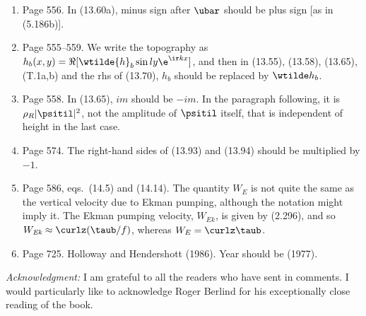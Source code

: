 \documentclass[10pt]{article}
\begin{document}
\begin{enumerate}
\item Page 556. In  (13.60a), minus sign after $\ubar$ should be plus sign [as in (5.186b)].

\item Page 555--559. We write the topography as $h_b(x,y)= \Re [ \wtilde{h}_b \sin ly \e^{\ir kx} ]$, and then in (13.55), (13.58), (13.65), (T.1a,b) and the rhs of (13.70), $h_b$ should be replaced by $\wtilde h_b$.

\item Page 558. In (13.65), $im$ should be $-im$. In the paragraph following,
   it is $\rho_R |\psitil|^2$, not the amplitude of $\psitil$ itself, that is independent of height in the last case.

\item Page 574. The right-hand sides of (13.93) and (13.94) should be multiplied by $-1$.

\item Page 586, eqs.\ (14.5) and (14.14). The quantity $W_E$ is not quite the same as the vertical velocity due to Ekman pumping, although the notation might imply it. The Ekman pumping velocity, $W_{\textit{Ek}}$, is given by (2.296), and so $W_{\textit{Ek}} \approx \curlz (\taub/f)$, whereas $W_E = \curlz \taub$.

\item Page 725. Holloway and Hendershott (1986). Year should be (1977).

\end{enumerate}

\noindent \textit{Acknowledgment:} I am grateful to all the readers who have sent in comments. I would particularly like to acknowledge Roger Berlind for his exceptionally close reading of the book.
\end{document}
